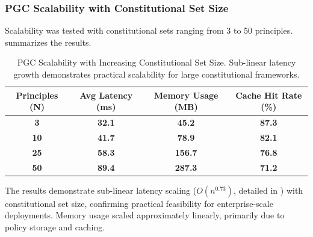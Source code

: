 \documentclass[manuscript,screen,review,anonymous,9pt]{acmart}
\newcommand{\tablesize}{\footnotesize} %
\newcommand{\tablenumfmt}[1]{\textbf{#1}}
\newcommand{\tableheader}[1]{\textbf{#1}}
\begin{document}
\subsubsection{PGC Scalability with Constitutional Set Size}
Scalability was tested with constitutional sets ranging from 3 to 50 principles.  summarizes the results.
\begin{table}[htbp]
\centering
\caption{PGC Scalability with Increasing Constitutional Set Size. Sub-linear latency growth demonstrates practical scalability for large constitutional frameworks.}
\label{tab:pgc_scalability}
\tablesize
\begin{tabular}{@{}cccc@{}}
\toprule
\tableheader{Principles (N)} & \tableheader{Avg Latency (ms)} & \tableheader{Memory Usage (MB)} & \tableheader{Cache Hit Rate (\%)} \\
\midrule
\tablenumfmt{3}   & \tablenumfmt{32.1}  & \tablenumfmt{45.2}  & \tablenumfmt{87.3} \\
\tablenumfmt{10}  & \tablenumfmt{41.7}  & \tablenumfmt{78.9}  & \tablenumfmt{82.1} \\
\tablenumfmt{25}  & \tablenumfmt{58.3}  & \tablenumfmt{156.7} & \tablenumfmt{76.8} \\
\tablenumfmt{50}  & \tablenumfmt{89.4}  & \tablenumfmt{287.3} & \tablenumfmt{71.2} \\
\bottomrule
\end{tabular}
\end{table}
The results demonstrate sub-linear latency scaling ($O(n^{0.73})$, detailed in ) with constitutional set size, confirming practical feasibility for enterprise-scale deployments. Memory usage scaled approximately linearly, primarily due to policy storage and caching.
\end{document}

